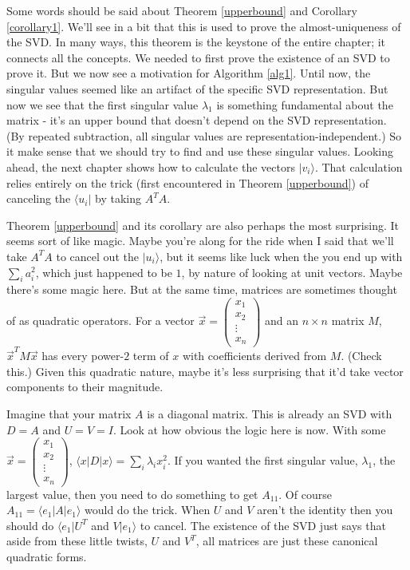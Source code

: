 \documentclass{amsbook}
\begin{document}
Some words should be said about Theorem \ref{upperbound} and Corollary \ref{corollary1}.  We'll see in a bit that this is used to prove the almost-uniqueness of the SVD.  In many ways, this theorem is the keystone of the entire chapter; it connects all the concepts.  We needed to first prove the existence of an SVD to prove it.  But we now see a motivation for Algorithm \ref{alg1}.  Until now, the singular values seemed like an artifact of the specific SVD representation.  But now we see that the first singular value $\lambda_1$ is something fundamental about the matrix - it's an upper bound that doesn't depend on the SVD representation.  (By repeated subtraction, all singular values are representation-independent.)  So it make sense that we should try to find and use these singular values.  Looking ahead, the next chapter shows how to calculate the vectors $|v_i\rangle$.  That calculation relies entirely on the trick (first encountered in Theorem \ref{upperbound}) of canceling the $\langle u_i|$ by taking $A^TA$.

Theorem \ref{upperbound} and its corollary are also perhaps the most surprising.  It seems sort of like magic.  Maybe you're along for the ride when I said that we'll take $A^TA$ to cancel out the $|u_i\rangle$, but it seems like luck when the you end up with $\sum_ia_i^2$, which just happened to be $1$, by nature of looking at unit vectors.  Maybe there's some magic here.  But at the same time, matrices are sometimes thought of as quadratic operators.  For a vector $\vec x=\left(\begin{array}{c}x_1\\x_2\\\vdots\\x_n\end{array}\right)$ and an $n\times n$ matrix $M$, $\vec x^TM\vec x$ has every power-$2$ term of $x$ with coefficients derived from $M$.  (Check this.)  Given this quadratic nature, maybe it's less surprising that it'd take vector components to their magnitude.

Imagine that your matrix $A$ is a diagonal matrix.  This is already an SVD with $D=A$ and $U=V=I$.  Look at how obvious the logic here is now.  With some $\vec x=\left(\begin{array}{c}x_1\\x_2\\\vdots\\x_n\end{array}\right)$, $\langle x|D|x\rangle=\sum_i\lambda_ix_i^2$.  If you wanted the first singular value, $\lambda_1$, the largest value, then you need to do something to get $A_{11}$.  Of course $A_{11}=\langle e_1|A|e_1\rangle$ would do the trick.  When $U$ and $V$ aren't the identity then you should do $\langle e_1|U^T$ and $V|e_1\rangle$ to cancel.  The existence of the SVD just says that aside from these little twists, $U$ and $V^T$, all matrices are just these canonical quadratic forms.
\end{document}
